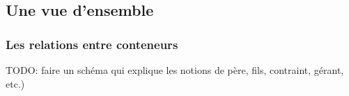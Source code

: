 \subsection{Une vue d'ensemble}
\subsubsection{Les relations entre conteneurs}
TODO: faire un schéma qui explique les notions de père, fils, contraint, gérant, etc.)
